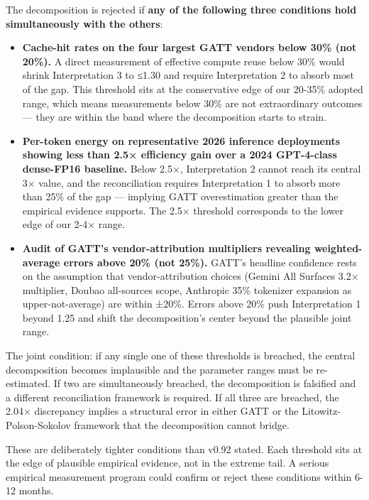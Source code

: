 \documentclass[11pt,a4paper]{article}
\begin{document}
The decomposition is rejected if \textbf{any of the following three conditions hold simultaneously with the others}:

\begin{itemize}
  \item \textbf{Cache-hit rates on the four largest GATT vendors below 30\% (not 20\%).} A direct measurement of effective compute reuse below 30\% would shrink Interpretation 3 to ≤1.30 and require Interpretation 2 to absorb most of the gap. This threshold sits at the conservative edge of our 20-35\% adopted range, which means measurements below 30\% are not extraordinary outcomes --- they are within the band where the decomposition starts to strain.
  \item \textbf{Per-token energy on representative 2026 inference deployments showing less than 2.5× efficiency gain over a 2024 GPT-4-class dense-FP16 baseline.} Below 2.5×, Interpretation 2 cannot reach its central 3× value, and the reconciliation requires Interpretation 1 to absorb more than 25\% of the gap --- implying GATT overestimation greater than the empirical evidence supports. The 2.5× threshold corresponds to the lower edge of our 2-4× range.
  \item \textbf{Audit of GATT's vendor-attribution multipliers revealing weighted-average errors above 20\% (not 25\%).} GATT's headline confidence rests on the assumption that vendor-attribution choices (Gemini All Surfaces 3.2× multiplier, Doubao all-sources scope, Anthropic 35\% tokenizer expansion as upper-not-average) are within ±20\%. Errors above 20\% push Interpretation 1 beyond 1.25 and shift the decomposition's center beyond the plausible joint range.
\end{itemize}

The joint condition: if any single one of these thresholds is breached, the central decomposition becomes implausible and the parameter ranges must be re-estimated. If two are simultaneously breached, the decomposition is falsified and a different reconciliation framework is required. If all three are breached, the 2.04× discrepancy implies a structural error in either GATT or the Litowitz-Polson-Sokolov framework that the decomposition cannot bridge.

These are deliberately tighter conditions than v0.92 stated. Each threshold sits at the edge of plausible empirical evidence, not in the extreme tail. A serious empirical measurement program could confirm or reject these conditions within 6-12 months.
\end{document}
